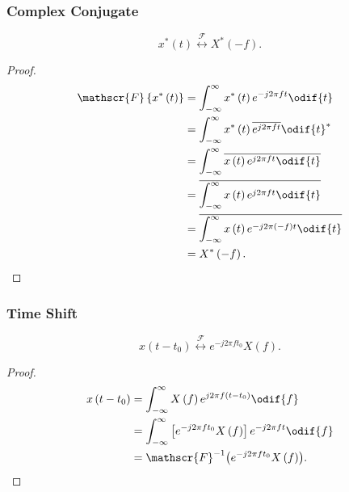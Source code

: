 \documentclass{article}
\begin{document}
\subsubsection{Complex Conjugate}
\begin{equation*}
    x^\ast\left( t \right) \overset{\mathscr{F}}{\longleftrightarrow} X^\ast\left( -f \right).
\end{equation*}
\begin{proof}
    \begin{align*}
        \mathscr{F}\left\{ x^\ast\left( t \right) \right\} & = \int_{-\infty}^\infty x^\ast\left( t \right) e^{-j 2\pi f t} \odif{t}                       \\
                                                           & = \int_{-\infty}^\infty x^\ast\left( t \right) \overline{e^{j 2\pi f t}} \odif{t}^\ast        \\
                                                           & = \int_{-\infty}^\infty \overline{x\left( t \right) e^{j 2\pi f t} \odif{t}}                  \\
                                                           & = \overline{\int_{-\infty}^\infty x\left( t \right) e^{j 2\pi f t} \odif{t}}                  \\
                                                           & = \overline{\int_{-\infty}^\infty x\left( t \right) e^{-j 2\pi \left( -f \right) t} \odif{t}} \\
                                                           & = X^\ast\left( -f \right).
    \end{align*}
\end{proof}
\subsubsection{Time Shift}
\begin{equation*}
    x\left( t - t_0 \right) \overset{\mathscr{F}}{\longleftrightarrow} e^{-j 2\pi f t_0} X\left( f \right).
\end{equation*}
\begin{proof}
    \begin{align*}
        x\left( t - t_0 \right) & = \int_{-\infty}^\infty X\left( f \right) e^{j 2\pi f \left( t - t_0 \right)} \odif{f}              \\
                                & = \int_{-\infty}^\infty \left[ e^{-j 2\pi f t_0} X\left( f \right) \right] e^{-j 2\pi f t} \odif{f} \\
                                & = \mathscr{F}^{-1}{\left( e^{-j 2\pi f t_0} X\left( f \right) \right)}.
    \end{align*}
\end{proof}
\end{document}
